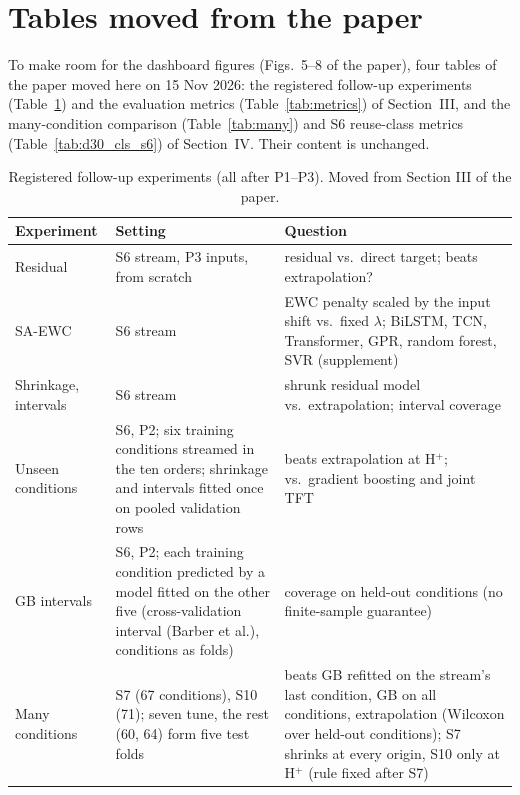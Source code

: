 \documentclass[conference]{IEEEtran}
\begin{document}
\section{Tables moved from the paper}

To make room for the dashboard figures (Figs.~5--8 of the paper), four tables of the paper moved here on 15 Nov
2026: the registered follow-up experiments (Table~\ref{tab:exps}) and the evaluation metrics (Table~\ref{tab:metrics})
of Section~III, and the many-condition comparison (Table~\ref{tab:many}) and S6 reuse-class metrics
(Table~\ref{tab:d30_cls_s6}) of Section~IV. Their content is unchanged.

\begin{table}[t]
  \centering
  \caption{Registered follow-up experiments (all after P1--P3). Moved from Section III of the paper.}
  \label{tab:exps}
  \scriptsize
  \setlength{\tabcolsep}{2pt}
  \begin{tabular}{p{1.25cm}p{3.35cm}p{3.6cm}}
    \toprule
    Experiment & Setting & Question \\
    \midrule
    Residual & S6 stream, P3 inputs, from scratch & residual vs.\ direct target; beats extrapolation? \\
    SA-EWC & S6 stream & EWC penalty scaled by the input shift vs.\ fixed $\lambda$; BiLSTM, TCN, Transformer, GPR, random forest, SVR (supplement) \\
    Shrinkage, intervals & S6 stream & shrunk residual model vs.\ extrapolation; interval coverage \\
    Unseen conditions & S6, P2; six training conditions streamed in the ten orders; shrinkage and intervals fitted once on pooled validation rows & beats extrapolation at H$^+$; vs.\ gradient boosting and joint TFT \\
    GB intervals & S6, P2; each training condition predicted by a model fitted on the other five (cross-validation interval (Barber et al.), conditions as folds) & coverage on held-out conditions (no finite-sample guarantee) \\
    Many conditions & S7 (67 conditions), S10 (71); seven tune, the rest (60, 64) form five test folds & beats GB refitted on the stream's last condition, GB on all conditions, extrapolation (Wilcoxon over held-out conditions); S7 shrinks at every origin, S10 only at H$^+$ (rule fixed after S7) \\
    \bottomrule
  \end{tabular}
\end{table}
\end{document}
